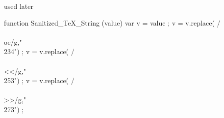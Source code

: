 


 used later

  function Sanitized_TeX_String (value)
    { var v = value ;
      v = v.replace(  /\\\\oe/g,"\\234") ;
      v = v.replace(  /\\\\<</g,"\\253") ;
      v = v.replace(  /\\\\>>/g,"\\273") ;
}
